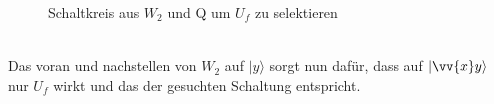 \documentclass[a4paper]{scrartcl}
\begin{document}
\begin{figure}[htp] 
\caption{Schaltkreis aus $W_2$ und Q um $U_f$ zu selektieren}
\end{figure}\\
Das voran und nachstellen von $W_2$ auf $|y\rangle$ sorgt nun dafür, dass auf $|\vv{x}y\rangle$ nur $U_f$ wirkt und das der gesuchten Schaltung entspricht.

\newpage
\end{document}
